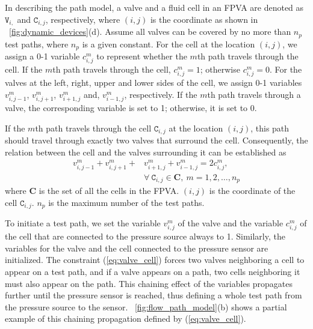 In describing the path model, a valve
and a fluid cell in an FPVA are denoted as $\mathtt{V}_{i,}$ and
$\mathtt{C}_{i,j}$, respectively, where $(i,j)$ is the coordinate as shown in
\figname~\ref{fig:dynamic_devices}(d).
Assume all valves can be covered by 
no more than $n_p$ test paths, 
where $n_p$ is a given constant. 
For the cell at the location $(i,j)$, we assign
a 0-1 variable $c^m_{i,j}$ to represent whether the $m$th path travels through
the cell. If the $m$th path travels through the cell,
$c^m_{i,j}=1$; otherwise $c^m_{i,j}=0$.
For the valves at the left, right, upper and lower sides of the cell, 
we assign 0-1 variables 
$v_{i, j-1}^m$, $v_{i, j+1}^m$, $v_{i+1, j}^m$ and, $v_{i-1, j}^m$, respectively. If 
the $m$th path travels through a valve, the corresponding variable is set to 1;
otherwise, it is set to 0.  

If the $m$th path travels through
the cell $\mathtt{C}_{i,j}$ at the location $(i,j)$, this path should travel through exactly 
two valves that surround the cell.
Consequently, the relation between the cell and the valves surrounding it can be
established as
\begin{align}
\label{eq:valve_cell}
v_{i, j-1}^m + v_{i, j+1}^m +& v_{i+1, j}^m + v_{i-1, j}^m=2c^m_{i,j}, \\  
&\forall\ \mathtt{C}_{i,j}\in \mathbf{C}, \ m=1, 2,\dots, n_p\nonumber
\end{align}
where $\mathbf{C}$ is the set of all the cells in the FPVA.
$(i,j)$ is the coordinate of the cell $\mathtt{C}_{i,j}$. 
$n_p$ is the maximum number of the
test paths.

To initiate a test path, we set the variable 
$v^m_{i,j}$ of the valve and the variable  
$c^m_{i,j}$ 
of the cell that are connected to the pressure source always 
to 1. Similarly, the variables for the valve and the cell connected to the
pressure sensor are initialized. 
The constraint (\ref{eq:valve_cell}) forces two valves neighboring a cell to
appear on a test path, and if a valve appears on a path, two cells
neighboring it must also appear on the path.
This chaining effect of the variables propagates further until the pressure
sensor is reached, thus defining a whole test path from the pressure
source to the sensor.
 \figname~\ref{fig:flow_path_model}(b) shows a partial example of this
chaining propagation defined by (\ref{eq:valve_cell}).

